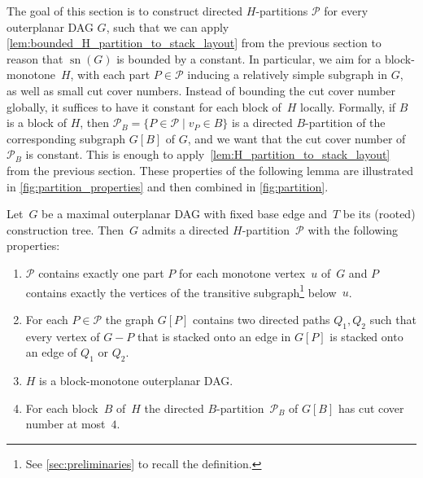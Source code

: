 \documentclass{article}
\DeclareMathOperator{\sn}{sn}
\newcommand{\calP}{\ensuremath{\mathcal{P}}\xspace}
\newcommand{\Hpartition}{$H$\nobreakdash-partition\xspace}
\begin{document}
The goal of this section is to construct directed \Hpartition{}s $\calP$ for every outerplanar DAG $G$, such that we can apply \cref{lem:bounded_H_partition_to_stack_layout} from the previous section to reason that $\sn(G)$ is bounded by a constant.
In particular, we aim for a block-monotone~$H$, with each part $P \in \calP$ inducing a relatively simple subgraph in $G$, as well as small cut cover numbers.
Instead of bounding the cut cover number globally, it suffices to have it constant for each block of~$H$ locally.
Formally, if $B$ is a block of $H$, then $\calP_B = \{P \in \calP \mid v_P \in B\}$ is a directed $B$-partition of the corresponding subgraph $G[B]$ of $G$, and we want that the cut cover number of $\calP_B$ is constant.
This is enough to apply~\cref{lem:H_partition_to_stack_layout} from the previous section.
These properties of the following lemma are illustrated in \cref{fig:partition_properties} and then combined in \cref{fig:partition}.

\begin{lemma}
    \label{lem:construct_H_partition}
    Let~$G$ be a maximal outerplanar DAG with fixed base edge and~$T$ be its (rooted) construction tree.
    Then~$G$ admits a directed \Hpartition~$\calP$ with the following properties:
    \begin{enumerate}[(P1)]
        \item\label{prop:parts_maximal_transitive_subgraphs}
        $\calP$ contains exactly one part $P$ for each monotone vertex~$u$ of~$G$ and $P$ contains exactly the vertices of the transitive subgraph\footnote{See \cref{sec:preliminaries} to recall the definition.} below~$u$.
        \item\label{prop:two_paths}
        For each $P \in \calP$ the graph $G[P]$ contains two directed paths $Q_1,Q_2$ such that every vertex of $G - P$ that is stacked onto an edge in $G[P]$ is stacked onto an edge of $Q_1$ or $Q_2$.
        \item\label{prop:H_block_monotone}
        $H$ is a block-monotone outerplanar DAG.
        \item\label{prop:block_cut_cover_number_bounded}
        For each block~$B$ of~$H$ the directed $B$-partition~$\calP_B$ of $G[B]$ has cut cover number at most~$4$.
    \end{enumerate}
\end{lemma}
\end{document}
